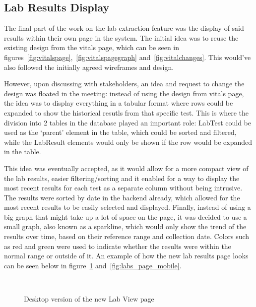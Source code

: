 \subsection{Lab Results Display}

The final part of the work on the lab extraction feature was the display of said results within their own page in the system. The initial idea was to reuse the existing design from the vitals page, which can be seen in figures~\ref{fig:vitalspage},~\ref{fig:vitalspagegraph} and~\ref{fig:vitalchanges}. This would've also followed the initially agreed wireframes and design. 

However, upon discussing with stakeholders, an idea and request to change the design was floated in the meeting: instead of using the design from vitals page, the idea was to display everything in a tabular format where rows could be expanded to show the historical resutls from that specific test. This is where the division into 2 tables in the database played an important role: LabTest could be used as the `parent' element in the table, which could be sorted and filtered, while the LabResult elements would only be shown if the row would be expanded in the table. 

This idea was eventually accepted, as it would allow for a more compact view of the lab results, easier filtering/sorting and it enabled for a way to display the most recent results for each test as a separate column without being intrusive. The results were sorted by date in the backend already, which allowed for the most recent results to be easily selected and displayed. Finally, instead of using a big graph that might take up a lot of space on the page, it was decided to use a small graph, also known as a sparkline, which would only show the trend of the results over time, based on their reference range and collection date. Colors such as red and green were used to indicate whether the results were within the normal range or outside of it. An example of how the new lab results page looks can be seen below in figure~\ref{fig:labs_page} and~\ref{fig:labs_page_mobile}.

\begin{figure}[ht]
  \centering
  \\[\baselineskip]
  \caption{Desktop version of the new Lab View page}\label{fig:labs_page}
\end{figure}

